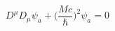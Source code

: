 \begin{equation}
\label{e4:46}
D^{\mu}D_{\mu}\psi_a+\Big(\frac{Mc}{\hbar}\Big)^2\psi_a=0
\end{equation}

